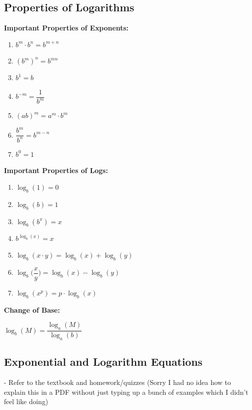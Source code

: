 \documentclass[12pt]{article}
\newenvironment{myindentpar}[1]%
     {\begin{list}{}%
             {\setlength{\leftmargin}{#1}}%
             \item[]%
     }
     {\end{list}}
\begin{document}
\newpage

\subsection{Properties of Logarithms}

\textbf{Important Properties of Exponents:}
\begin{myindentpar}{2cm}
\begin{enumerate}
\item $b^m \cdot b^n = b^{m+n}$ 
\item $(b^m)^n = b^{mn}$
\item $b^{1} = b$
\item $b^{-m} = \dfrac{1}{b^{m}}$
\item $(ab)^m = a^m \cdot b^m$
\item $\dfrac{b^{m}}{b^n} = b^{m-n}$
\item $b^{0} = 1$
\end{enumerate}
\end{myindentpar}


\textbf{Important Properties of Logs:}
\begin{myindentpar}{2cm}
\begin{enumerate}
\item $\log_{b}(1) = 0$
\item $\log_{b}(b) = 1$
\item $\log_{b}(b^{x})= x$
\item $b^{\log_{b}(x)} = x$
\item $\log_{b}(x \cdot y) = \log_{b}(x) + \log_{b}(y)$ 
\item $\log_{b}\Big(\dfrac{x}{y}\Big) = \log_{b}(x) - \log_{b}(y)$
\item $\log_{b}(x^{p}) = p \cdot \log_{b}(x)$
\end{enumerate}
\end{myindentpar}

\textbf{Change of Base:}
\newline

\centerline{$\log_{b}(M) = \dfrac{\log_{a}(M)}{\log_{a}(b)}$}

\subsection{Exponential and Logarithm Equations}

- Refer to the textbook and homework/quizzes (Sorry I had no idea how to explain this in a PDF without just typing up a bunch of examples which I didn't feel like doing)
\end{document}
